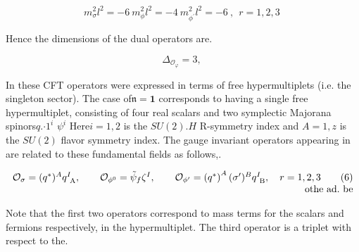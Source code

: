 \documentclass{article}
\begin{document}
\begin{equation}
m _ { \sigma } ^ { 2 } l ^ { 2 } = - 6 ~ m _ { \phi } ^ { 2 } l ^ { 2 } = - 4 ~ m _ { \phi ^ { \prime } } ^ { 2 } l ^ { 2 } = - 6 ~, ~ ~ r = 1, 2, 3 ~
\end{equation}


Hence the dimensions of the dual operators are.


\begin{equation}
\Delta _ { \mathcal { O } _ { \varphi } } = 3, ~
\end{equation}


In these CFT operators were expressed in terms of free hypermultiplets (i.e. the singleton
sector). The case of${ \mathfrak { n } } = \mathbf { 1 }$ corresponds to having a single free hypermultiplet, consisting of
four real scalars and two symplectic Majorana spinors$q . { \cdot 1 } ^ { i }$ $\psi ^ { i }$ Here$i = 1, 2$ is the $S U ( 2 ) . { H }$
R-symmetry index and $A = 1, z$ is the $S U ( 2 )$ flavor symmetry index. The gauge invariant
operators appearing in are related to these fundamental fields as follows,.


\begin{equation}
\begin{array} { r l } { \mathcal { O } _ { \sigma } = ( q ^ { * } ) ^ { A } q _ { \mathrm { ~ A } } ^ { I }, \qquad \mathcal { O } _ { \phi ^ { 0 } } = \tilde { \psi } _ { f } \zeta ^ { I }, \qquad \mathcal { O } _ { \phi ^ { \prime } } = \left ( q ^ { * } \right ) ^ { A } ( \sigma ^ { \prime } ) ^ { B } q _ { \mathrm { ~ B } } ^ { I }, \quad r = 1, 2, 3 \qquad ( 6 ) } \\ { \mathrm { ~ o t h e ~ a d. ~ b e}}\end{array}
\end{equation}


Note that the first two operators correspond to mass terms for the scalars and fermions
respectively, in the hypermultiplet. The third operator is a triplet with respect to the.
\end{document}
